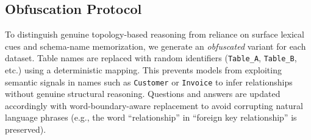 \subsection{Obfuscation Protocol}

To distinguish genuine topology-based reasoning from reliance on
surface lexical cues and schema-name memorization,
we generate an \emph{obfuscated} variant for each dataset.  Table names
are replaced with random identifiers (\texttt{Table\_A},
\texttt{Table\_B}, etc.) using a deterministic mapping.
This prevents models from exploiting semantic signals in
names such as \texttt{Customer} or \texttt{Invoice} to infer
relationships without genuine structural reasoning.
Questions and answers are updated accordingly with
word-boundary-aware replacement to avoid corrupting natural
language phrases (e.g., the word ``relationship'' in
``foreign key relationship'' is preserved).
